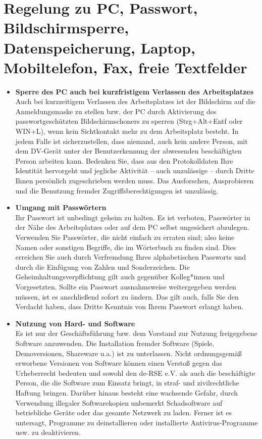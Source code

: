 \documentclass[a4paper, fontsize=11pt]{scrartcl}
\begin{document}
\section{Regelung zu PC, Passwort, Bildschirmsperre, Datenspeicherung, Laptop,
Mobiltelefon, Fax, freie Textfelder}
\begin{itemize}
  \item \textbf{Sperre des PC auch bei kurzfristigem Verlassen des Arbeitsplatzes}\\ Auch bei kurzzeitigem Verlassen des Arbeitsplatzes ist der Bildschirm auf die Anmeldungsmaske zu stellen bzw. der PC durch Aktivierung des passwortgeschützten Bildschirmschoners zu sperren (Strg+Alt+Entf oder WIN+L), wenn kein Sichtkontakt mehr zu dem Arbeitsplatz besteht. In jedem Falle ist sicherzustellen, dass niemand, auch kein andere Person, mit dem DV-Gerät unter der Benutzerkennung der abwesenden beschäftigten Person arbeiten kann. Bedenken Sie, dass aus den Protokolldaten Ihre Identität hervorgeht und jegliche Aktivität – auch unzulässige – durch Dritte Ihnen persönlich zugeschrieben werden muss. Das Ausforschen, Ausprobieren und die Benutzung fremder Zugriffsberechtigungen ist unzulässig.
  \item \textbf{Umgang mit Passwörtern} \\ Ihr Passwort ist unbedingt geheim zu halten. Es ist verboten, Passwörter in der Nähe des Arbeitsplatzes oder auf dem PC selbst ungesichert abzulegen. Verwenden Sie Passwörter, die nicht einfach zu erraten sind; also keine Namen oder sonstigen Begriffe, die im Wörterbuch zu finden sind. Dies erreichen Sie auch durch Verfremdung Ihres alphabetischen Passworts und durch die Einfügung von Zahlen und Sonderzeichen.
  Die Geheimhaltungsverpflichtung gilt auch gegenüber Kolleg*innen und Vorgesetzten. Sollte ein Passwort ausnahmsweise weitergegeben werden müssen, ist es anschließend sofort zu ändern. Das gilt auch, falls Sie den Verdacht haben, dass Dritte Kenntnis von Ihrem Passwort erlangt haben.
  \item \textbf{Nutzung von Hard- und Software} \\ Es ist nur der Geschäftsführung bzw. dem Vorstand zur Nutzung freigegebene Software anzuwenden. Die Installation fremder Software (Spiele, Demoversionen, Shareware u.a.) ist zu unterlassen.
  Nicht ordnungsgemäß erworbene Versionen von Software können einen Verstoß gegen das Urheberrecht bedeuten und sowohl den de-RSE e.V. als auch die beschäftigte Person, die die Software zum Einsatz bringt, in straf- und zivilrechtliche Haftung bringen. Darüber hinaus besteht eine wachsende Gefahr, durch Verwendung illegaler Softwarekopien unbemerkt Schadsoftware auf betriebliche Geräte oder das gesamte Netzwerk zu laden. Ferner ist es untersagt, Programme zu deinstallieren oder installierte Antivirus-Programme usw. zu deaktivieren.

\end{itemize}
\end{document}
